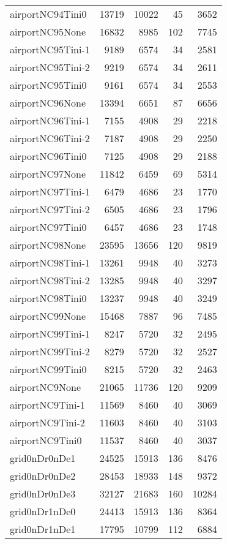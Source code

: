 \begin{longtable}{lrrrr}
airportNC94Tini0 & 13719 & 10022 & 45 & 3652 \\
airportNC95None & 16832 & 8985 & 102 & 7745 \\
airportNC95Tini-1 & 9189 & 6574 & 34 & 2581 \\
airportNC95Tini-2 & 9219 & 6574 & 34 & 2611 \\
airportNC95Tini0 & 9161 & 6574 & 34 & 2553 \\
airportNC96None & 13394 & 6651 & 87 & 6656 \\
airportNC96Tini-1 & 7155 & 4908 & 29 & 2218 \\
airportNC96Tini-2 & 7187 & 4908 & 29 & 2250 \\
airportNC96Tini0 & 7125 & 4908 & 29 & 2188 \\
airportNC97None & 11842 & 6459 & 69 & 5314 \\
airportNC97Tini-1 & 6479 & 4686 & 23 & 1770 \\
airportNC97Tini-2 & 6505 & 4686 & 23 & 1796 \\
airportNC97Tini0 & 6457 & 4686 & 23 & 1748 \\
airportNC98None & 23595 & 13656 & 120 & 9819 \\
airportNC98Tini-1 & 13261 & 9948 & 40 & 3273 \\
airportNC98Tini-2 & 13285 & 9948 & 40 & 3297 \\
airportNC98Tini0 & 13237 & 9948 & 40 & 3249 \\
airportNC99None & 15468 & 7887 & 96 & 7485 \\
airportNC99Tini-1 & 8247 & 5720 & 32 & 2495 \\
airportNC99Tini-2 & 8279 & 5720 & 32 & 2527 \\
airportNC99Tini0 & 8215 & 5720 & 32 & 2463 \\
airportNC9None & 21065 & 11736 & 120 & 9209 \\
airportNC9Tini-1 & 11569 & 8460 & 40 & 3069 \\
airportNC9Tini-2 & 11603 & 8460 & 40 & 3103 \\
airportNC9Tini0 & 11537 & 8460 & 40 & 3037 \\
grid0nDr0nDe1 & 24525 & 15913 & 136 & 8476 \\
grid0nDr0nDe2 & 28453 & 18933 & 148 & 9372 \\
grid0nDr0nDe3 & 32127 & 21683 & 160 & 10284 \\
grid0nDr1nDe0 & 24413 & 15913 & 136 & 8364 \\
grid0nDr1nDe1 & 17795 & 10799 & 112 & 6884 \\

\end{longtable}
